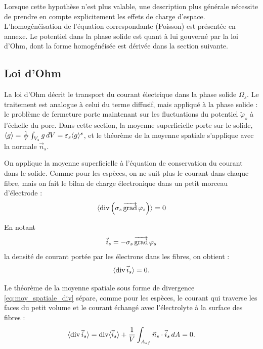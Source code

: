 Lorsque cette hypothèse n'est plus valable, une description plus générale
nécessite de prendre en compte explicitement les effets de charge d'espace.
L'homogénéisation de l'équation correspondante (Poisson) est présentée en annexe.
Le potentiel dans la phase solide est quant à lui gouverné par la loi
d'Ohm, dont la forme homogénéisée est dérivée dans la section suivante.

\subsection*{Loi d'Ohm}

La loi d'Ohm décrit le transport du courant électrique dans la phase
solide $\Omega_s$. Le traitement est analogue à celui du terme diffusif,
mais appliqué à la phase solide : le problème de fermeture porte
maintenant sur les fluctuations du potentiel $\widetilde{\varphi}_s$
à l'échelle du pore. Dans cette section, la moyenne superficielle porte sur le
solide, $\langle g \rangle = \frac{1}{V}\int_{V_s} g\, dV = \varepsilon_s \langle g \rangle^s$, et le
théorème de la moyenne spatiale s'applique avec la normale $\vec{n}_s$.


On applique la moyenne superficielle à l'équation de conservation du courant
dans le solide. Comme pour les espèces, on ne suit plus le courant dans chaque
fibre, mais on fait le bilan de charge électronique dans un petit morceau
d'électrode :
\begin{equation}
\langle \operatorname{div}\left(\sigma_s \mathop{\overrightarrow{\operatorname{grad}}}\nolimits\varphi_s\right) \rangle = 0
\end{equation}

En notant
\begin{equation}
\vec{i}_s = -\sigma_s \mathop{\overrightarrow{\operatorname{grad}}}\nolimits\varphi_s
\end{equation}
la densité de courant portée par les électrons dans les fibres, on
obtient :
\begin{equation}
\langle \operatorname{div} \vec{i}_s \rangle=0.
\end{equation}

Le théorème de la moyenne spatiale sous forme de divergence
\eqref{eq:moy_spatiale_div} sépare, comme pour les espèces, le courant qui
traverse les faces du petit volume et le courant échangé avec l'électrolyte à
la surface des fibres :
\begin{equation}
\langle \operatorname{div} \vec{i}_s \rangle
=
\operatorname{div} \langle \vec{i}_s \rangle
+
\frac{1}{V}
\int_{A_{sf}}
\vec{n}_s \cdot \vec{i}_s\, dA
=
0.
\end{equation}

